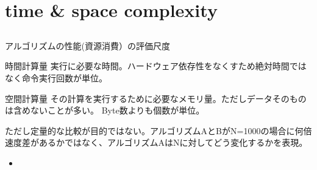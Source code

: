 \documentclass{beamer}
\subtitle{}
\begin{document}
\begin{frame}[fragile]{}
\titlepage
\end{frame}

\section{time \& space complexity}		%
\subsection{}

\begin{frame}[fragile]{アルゴリズムの性能(資源消費）の評価尺度}{}
\begin{block}{時間計算量}
実行に必要な時間。ハードウェア依存性をなくすため絶対時間ではなく命令実行回数が単位。
\end{block}
\begin{block}{空間計算量}
その計算を実行するために必要なメモリ量。ただしデータそのものは含めないことが多い。
Byte数よりも個数が単位。
\end{block}

\vfill
ただし定量的な比較が目的ではない。アルゴリズムAとBがN=1000の場合に何倍速度差があるかではなく、アルゴリズムAはNに対してどう変化するかを表現。
\begin{itemize}%
\item 

\end{itemize}

\end{frame}
\end{document}
